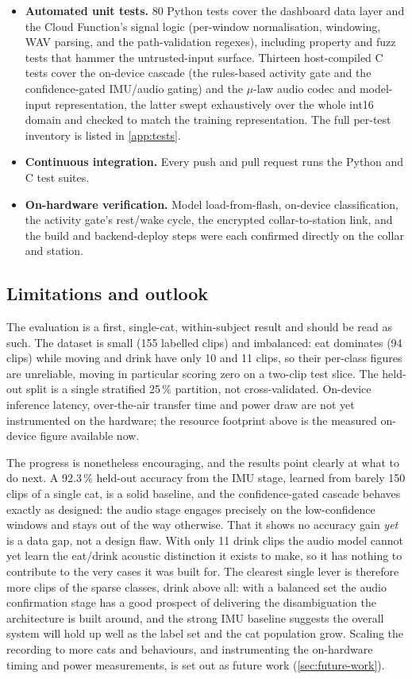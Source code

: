 \begin{itemize}[leftmargin=1.5em]
  \item \textbf{Automated unit tests.} 80 Python tests cover the dashboard data layer and the Cloud
        Function's signal logic (per-window normalisation, windowing, WAV parsing, and the path-validation
        regexes), including property and fuzz tests that hammer the untrusted-input surface. Thirteen
        host-compiled C tests cover the on-device cascade (the rules-based activity gate and the
        confidence-gated IMU/audio gating) and the $\mu$-law audio codec and model-input representation,
        the latter swept exhaustively over the whole int16 domain and checked to match the training
        representation. The full per-test inventory is listed in \cref{app:tests}.
  \item \textbf{Continuous integration.} Every push and pull request runs the Python and C test suites.
  \item \textbf{On-hardware verification.} Model load-from-flash, on-device classification, the activity
        gate's rest/wake cycle, the encrypted collar-to-station link, and the build and backend-deploy
        steps were each confirmed directly on the collar and station.
\end{itemize}

\subsection{Limitations and outlook}

The evaluation is a first, single-cat, within-subject result and should be read as such. The dataset is
small (155 labelled clips) and imbalanced: eat dominates (94 clips) while moving and drink have only 10
and 11 clips, so their per-class figures are unreliable, moving in particular scoring zero on a two-clip
test slice. The held-out split is a single stratified 25\,\% partition, not cross-validated. On-device
inference latency, over-the-air transfer time and power draw are not yet instrumented on the hardware; the
resource footprint above is the measured on-device figure available now.

The progress is nonetheless encouraging, and the results point clearly at what to do next. A 92.3\,\%
held-out accuracy from the IMU stage, learned from barely 150 clips of a single cat, is a solid baseline,
and the confidence-gated cascade behaves exactly as designed: the audio stage engages precisely on the
low-confidence windows and stays out of the way otherwise. That it shows no accuracy gain \emph{yet} is a
data gap, not a design flaw. With only 11 drink clips the audio model cannot yet learn the eat/drink
acoustic distinction it exists to make, so it has nothing to contribute to the very cases it was built
for. The clearest single lever is therefore more clips of the sparse classes, drink above all: with a
balanced set the audio confirmation stage has a good prospect of delivering the disambiguation the
architecture is built around, and the strong IMU baseline suggests the overall system will hold up well as
the label set and the cat population grow. Scaling the recording to more cats and behaviours, and
instrumenting the on-hardware timing and power measurements, is set out as future work
(\cref{sec:future-work}).
